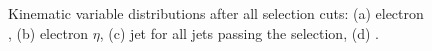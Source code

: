 \begin{figure}[!htp]
   \centering
   \hfill
   \caption[Kinematic variable distributions after all selection cuts]{Kinematic variable distributions after all
   selection cuts: (a) electron \pt, (b) electron $\eta$, (c) jet \pt for all jets passing the selection, (d) \MET.}
   \label{fig:controlplots}
\end{figure}


